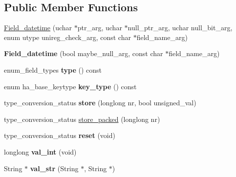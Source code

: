 \subsection*{Public Member Functions}
\begin{DoxyCompactItemize}
\item 
\mbox{\hyperlink{classField__datetime_a92f5fa57a245b08c63d8c44d7165a449}{Field\+\_\+datetime}} (uchar $\ast$ptr\+\_\+arg, uchar $\ast$null\+\_\+ptr\+\_\+arg, uchar null\+\_\+bit\+\_\+arg, enum utype unireg\+\_\+check\+\_\+arg, const char $\ast$field\+\_\+name\+\_\+arg)
\item 
\mbox{\label{classField__datetime_a660a653a4e81c516c56f0e34e83213b6}} 
{\bfseries Field\+\_\+datetime} (bool maybe\+\_\+null\+\_\+arg, const char $\ast$field\+\_\+name\+\_\+arg)
\item 
\mbox{\label{classField__datetime_a75cdfe9b4ac6339b5a9e94bd5dc6a55a}} 
enum\+\_\+field\+\_\+types {\bfseries type} () const
\item 
\mbox{\label{classField__datetime_a0812bc2ff111889cb370afba6d86afe5}} 
enum ha\+\_\+base\+\_\+keytype {\bfseries key\+\_\+type} () const
\item 
\mbox{\label{classField__datetime_aca31b8b80ed0c1ae7cc7fa9878180c95}} 
type\+\_\+conversion\+\_\+status {\bfseries store} (longlong nr, bool unsigned\+\_\+val)
\item 
type\+\_\+conversion\+\_\+status \mbox{\hyperlink{classField__datetime_aa9d26c9ee5595f5c10303bee4665a9e6}{store\+\_\+packed}} (longlong nr)
\item 
\mbox{\label{classField__datetime_ae8a95d6a07b7d3f5ee9cb536b61a54db}} 
type\+\_\+conversion\+\_\+status {\bfseries reset} (void)
\item 
\mbox{\label{classField__datetime_a0fdbb7b7cbef96b0a6777369fe4e987a}} 
longlong {\bfseries val\+\_\+int} (void)
\item 
\mbox{\label{classField__datetime_ad5b1f7a0032738b00a55bce38f39f90d}} 
String $\ast$ {\bfseries val\+\_\+str} (String $\ast$, String $\ast$)
\item 

\end{DoxyCompactItemize}
